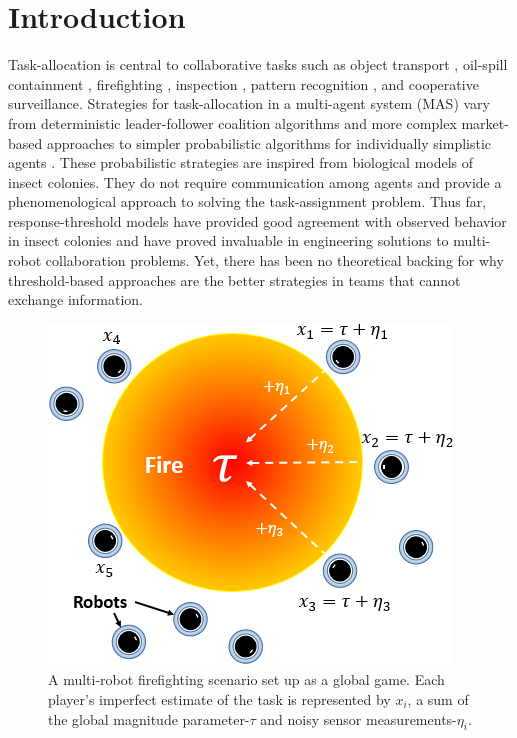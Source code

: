 \documentclass[conference]{ieeeconf}
\begin{document}
\section{Introduction}\label{sec:intro}
Task-allocation is central to collaborative tasks such as object transport \cite{Sugawara2012}, oil-spill containment \cite{Beni2005}, firefighting \cite{Kanakia2014}, inspection \cite{Correll2007}, pattern recognition \cite{Beni1993}, and cooperative surveillance. Strategies for task-allocation \cite{Gerkey2004} in a multi-agent system (MAS) vary from deterministic leader-follower coalition algorithms \cite{Chen2011} and more complex market-based approaches \cite{Amstutz2008} to simpler probabilistic algorithms for individually simplistic agents \cite{Dantu2012}. These probabilistic strategies are inspired from biological models of insect colonies. They do not require communication among agents and provide a phenomenological approach to solving the task-assignment problem. Thus far, response-threshold models have provided good agreement with observed behavior in insect colonies and have proved invaluable in engineering solutions to multi-robot collaboration problems. Yet, there has been no theoretical backing for why threshold-based approaches are the better strategies in teams that cannot exchange information.

\begin{figure}[!htb]
\centering\includegraphics[width=0.9\columnwidth]{../figures/globalgamesetup.png}
\centering\caption{A multi-robot firefighting scenario set up as a global game. Each player's imperfect estimate of the task is represented by $x_i$, a sum of the global magnitude parameter-$\tau$ and noisy sensor measurements-$\eta_i$.}\vspace{-10px}\label{fig:ggsetup}
\end{figure}
\end{document}
